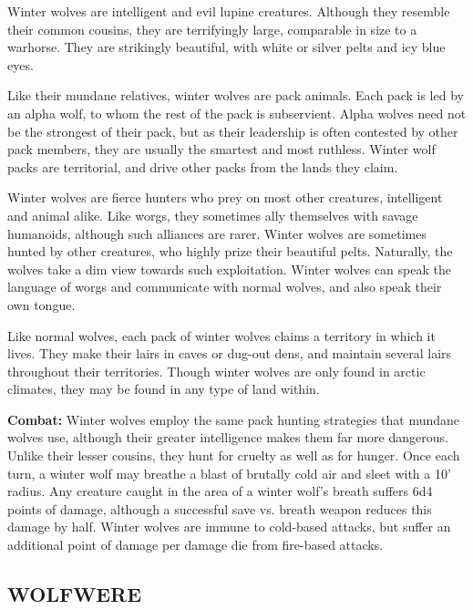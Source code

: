 \begin{multicols}{2}
\begin{minipage}{\columnwidth}
\end{minipage}

Winter wolves are intelligent and evil lupine creatures. Although they resemble their common cousins, they are terrifyingly large, comparable in size to a warhorse. They are strikingly beautiful, with white or silver pelts and icy blue eyes.

Like their mundane relatives, winter wolves are pack animals. Each pack is led by an alpha wolf, to whom the rest of the pack is subservient. Alpha wolves need not be the strongest of their pack, but as their leadership is often contested by other pack members, they are usually the smartest and most ruthless. Winter wolf packs are territorial, and drive other packs from the lands they claim.

Winter wolves are fierce hunters who prey on most other creatures, intelligent and animal alike. Like worgs, they sometimes ally themselves with savage humanoids, although such alliances are rarer. Winter wolves are sometimes hunted by other creatures, who highly prize their beautiful pelts. Naturally, the wolves take a dim view towards such exploitation. Winter wolves can speak the language of worgs and communicate with normal wolves, and also speak their own tongue.

Like normal wolves, each pack of winter wolves claims a territory in which it lives. They make their lairs in caves or dug-out dens, and maintain several lairs throughout their territories. Though winter wolves are only found in arctic climates, they may be found in any type of land within.

\textbf{Combat:} Winter wolves employ the same pack hunting strategies that mundane wolves use, although their greater intelligence makes them far more dangerous. Unlike their lesser cousins, they hunt for cruelty as well as for hunger. Once each turn, a winter wolf may breathe a blast of brutally cold air and sleet with a 10' radius. Any creature caught in the area of a winter wolf's breath suffers 6d4 points of damage, although a successful save vs. breath weapon reduces this damage by half. Winter wolves are immune to cold-based attacks, but suffer an additional point of damage per damage die from fire-based attacks.

\noindent
\begin{minipage}{\columnwidth}

\vspace{1em}

\subsection{WOLFWERE}


\end{minipage}
\end{multicols}
